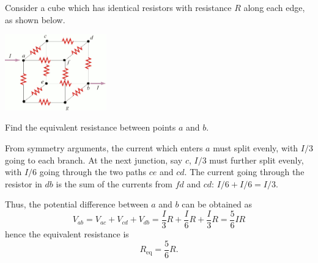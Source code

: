\documentclass{esg8022pset}
\begin{document}
\begin{problem}{}
  Consider a cube which has identical resistors with resistance $R$ along each edge, as shown below.
  \begin{center}\includegraphics[width=0.33\textwidth]{ps07_06}\end{center}
  Find the equivalent resistance between points $a$ and $b$.
\end{problem}
\begin{solution}
  From symmetry arguments, the current which enters $a$ must split evenly, with $I / 3$ going to each branch.  At the next junction, say $c$, $I / 3$ must further split evenly, with $I / 6$ going through the two paths $ce$ and $cd$.  The current going through the resistor in $db$ is the sum of the currents from $fd$ and $cd$: $I / 6 + I / 6 = I / 3$.
  
  Thus, the potential difference between $a$ and $b$ can be obtained as
  $$V_{ab} = V_{ac} + V_{cd} + V_{db} = \frac{I}{3}R + \frac{I}{6}R + \frac{I}{3}R = \frac56 IR$$
  hence the equivalent resistance is
  $$R_{\text{eq}} = \frac56 R.$$
\end{solution}
\end{document}
